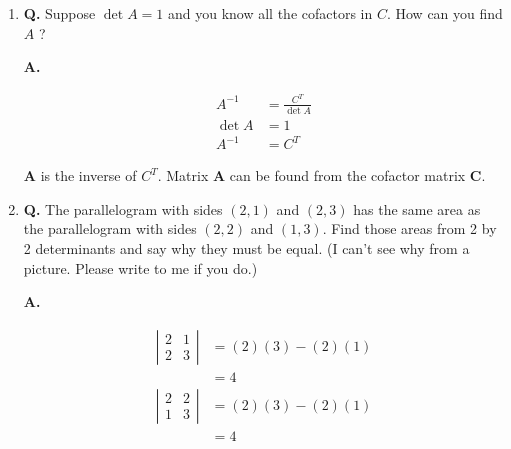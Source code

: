\documentclass[main.tex]{subfiles}
\begin{document}
\begin{enumerate}
\begin{enumerate}
$$\begin{aligned}
\begin{array}{ccc}
\begin{array}{ll}
        2 & -1 \\
        0 & -1
        \end{array}\right| & \left|\begin{array}{cc}
        2 & -1 \\
        -1 & 2
        \end{array}\right|
        \end{array}\right] \\
        &=\left[\begin{array}{lll}
        3 & 2 & 1 \\
        2 & 4 & 2 \\
        1 & 2 & 3
        \end{array}\right]\\
        A^{-1}&=\frac{1}{4}\left[\begin{array}{lll}
        3 & 2 & 1 \\
        2 & 4 & 2 \\
        1 & 2 & 3
        \end{array}\right]
        \end{aligned}
        $$
        
    \end{enumerate}
    
    \item [9.] \textbf{Q.} Suppose $\operatorname{det} A=1$ and you know all the cofactors in $C$. How can you find $A$ ? 
    
    \textbf{A.}
    
    $$
    \begin{aligned}
    A^{-1}&=\frac{C^{T}}{\operatorname{det} A}\\
    \operatorname{det} A &= 1\\
    A^{-1}&=C^{T}
    \end{aligned}
    $$
    
    $\boldsymbol{A}$ is the inverse of $C^{T}$. Matrix $\boldsymbol{A}$ can be found from the cofactor matrix $\boldsymbol{C}$.
    
    
    \item [19.] \textbf{Q.} The parallelogram with sides $(2,1)$ and $(2,3)$ has the same area as the parallelogram with sides $(2,2)$ and $(1,3)$. Find those areas from 2 by 2 determinants and say why they must be equal. (I can't see why from a picture. Please write to me if you do.) 

    \textbf{A.}
    
    $$
    \begin{aligned}
    \left|\begin{array}{ll}
    2 & 1 \\
    2 & 3
    \end{array}\right| &=(2)(3)-(2)(1)\\
    & = 4\\
    \left|\begin{array}{ll}
    2 & 2 \\
    1 & 3
    \end{array}\right| &=(2)(3)-(2)(1)\\
    &= 4
    \end{aligned}
    $$
    

\end{enumerate}
\end{document}
